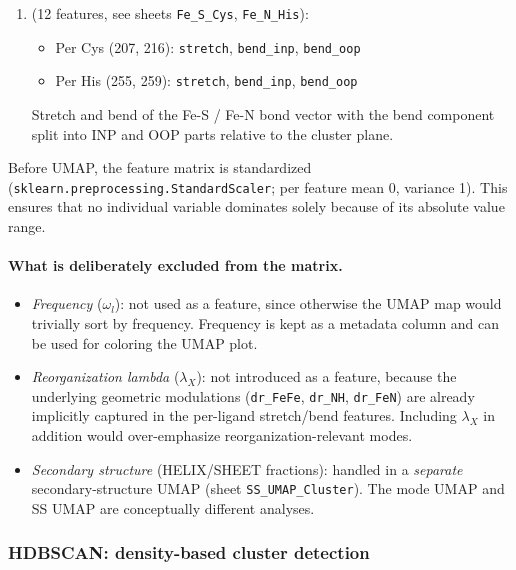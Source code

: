 \documentclass[11pt,a4paper,twoside]{article}
\theoremstyle{remark}
\begin{document}
\begin{enumerate}
  \item[\textbf{Per-ligand atom motions}] (12 features, see
        sheets \texttt{Fe\_S\_Cys}, \texttt{Fe\_N\_His}):
        \begin{itemize}\setlength{\itemsep}{0pt}
          \item Per Cys (207, 216): \texttt{stretch},
                \texttt{bend\_inp}, \texttt{bend\_oop}
          \item Per His (255, 259): \texttt{stretch},
                \texttt{bend\_inp}, \texttt{bend\_oop}
        \end{itemize}
        Stretch and bend of the Fe-S / Fe-N bond vector with
        the bend component split into INP and OOP parts relative
        to the cluster plane.
\end{enumerate}

Before UMAP, the feature matrix is standardized
(\texttt{sklearn.preprocessing.StandardScaler}; per feature mean
0, variance 1). This ensures that no individual variable dominates
solely because of its absolute value range.

\paragraph{What is deliberately excluded from the matrix.}

\begin{itemize}
  \item \emph{Frequency} ($\omega_l$): not used as a feature,
        since otherwise the UMAP map would trivially sort by
        frequency. Frequency is kept as a metadata column and can
        be used for coloring the UMAP plot.

  \item \emph{Reorganization lambda} ($\lambda_X$): not introduced
        as a feature, because the underlying geometric modulations
        (\texttt{dr\_FeFe}, \texttt{dr\_NH}, \texttt{dr\_FeN})
        are already implicitly captured in the per-ligand
        stretch/bend features. Including $\lambda_X$ in addition
        would over-emphasize reorganization-relevant modes.

  \item \emph{Secondary structure} (HELIX/SHEET fractions): handled
        in a \emph{separate} secondary-structure UMAP (sheet
        \texttt{SS\_UMAP\_Cluster}). The mode UMAP and SS UMAP
        are conceptually different analyses.
\end{itemize}

\subsubsection*{HDBSCAN: density-based cluster detection}
\end{document}

